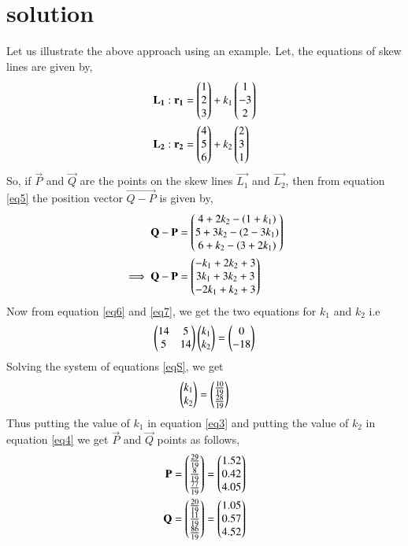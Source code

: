 \documentclass[journal,12pt,twocolumn]{IEEEtran}
\begin{document}
\section{solution}
Let us illustrate the above approach using an example. Let, the equations of skew lines are given by,
\begin{align}
\mathbf{L_1}: \mathbf{r_1}&=\begin{pmatrix}1\\2\\3\end{pmatrix}+k_1\begin{pmatrix}1\\-3\\2\end{pmatrix}\label{eqL1}\\
\mathbf{L_2}: \mathbf{r_2}&=\begin{pmatrix}4\\5\\6\end{pmatrix}+k_2\begin{pmatrix}2\\3\\1\end{pmatrix}\label{eqL2}
\end{align} 
So, if $\vec{P}$ and $\vec{Q}$ are the points on the skew lines $\vec{L_1}$ and $\vec{L_2}$, then from equation \ref{eq5} the position vector $\vec{Q-P}$ is given by,
\begin{align}
\mathbf{Q-P}&=\begin{pmatrix}4+2k_2-(1+k_1)\\5+3k_2-(2-3k_1)\\6+k_2-(3+2k_1)\end{pmatrix}\\
\implies\mathbf{Q-P}&=\begin{pmatrix}-k_1+2k_2+3\\3k_1+3k_2+3\\-2k_1+k_2+3\end{pmatrix}
\end{align}
Now from equation \ref{eq6} and \ref{eq7}, we get the two equations for $k_1$ and $k_2$ i.e
\begin{align}
\begin{pmatrix}14&5\\5&14\end{pmatrix}\begin{pmatrix}k_1\\k_2\end{pmatrix} = \begin{pmatrix}0\\-18\end{pmatrix}\label{eqS}
\end{align}
Solving the system of equations \ref{eqS}, we get 
\begin{align}
\begin{pmatrix}k_1\\k_2\end{pmatrix} = \begin{pmatrix}\frac{10}{19}\\\frac{28}{19}\end{pmatrix}
\end{align}
Thus putting the value of $k_1$ in equation \ref{eq3} and putting the value of $k_2$ in equation \ref{eq4} we get $\vec{P}$ and $\vec{Q}$ points as follows,
\begin{align}
\mathbf{P}&=\begin{pmatrix}\frac{29}{19}\\\frac{8}{19}\\\frac{77}{19}\end{pmatrix}=\begin{pmatrix}1.52\\0.42\\4.05\end{pmatrix}\\
\mathbf{Q}&=\begin{pmatrix}\frac{20}{19}\\\frac{11}{19}\\\frac{86}{19}\end{pmatrix}=\begin{pmatrix}1.05\\0.57\\4.52\end{pmatrix}
\end{align}
\end{document}
